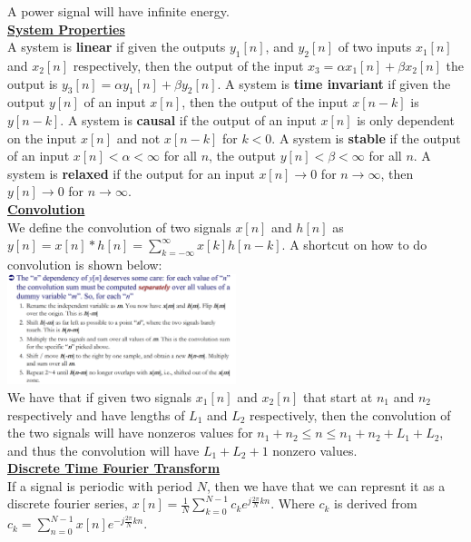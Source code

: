 \documentclass[10pt]{article}
\begin{document}
A power signal will have infinite energy.\\
\underline{\textbf{System Properties}}\\
A system is \textbf{linear} if given the outputs $y_1[n]$, and $y_2[n]$ of two inputs $x_1[n]$ and $x_2[n]$ respectively, 
then the output of the input $x_3=\alpha x_1[n]+\beta x_2[n]$ the output is $y_3[n]=\alpha y_1[n]+\beta y_2[n]$. 
A system is \textbf{time invariant} if given the output $y[n]$ of an input $x[n]$, then the output of the input $x[n-k]$ is $y[n-k]$. A system is \textbf{causal} if the output of an input $x[n]$ is only dependent on the input $x[n]$ and not $x[n-k]$ for $k<0$. 
A system is \textbf{stable} if the output of an input $x[n]<\alpha<\infty$ for all $n$, the output $y[n]<\beta<\infty$ for all $n$. A
system is \textbf{relaxed} if the output for an input $x[n]\to0$ for $n\to\infty$, then $y[n]\to0$ for $n\to\infty$.\\
\underline{\textbf{Convolution}}\\
We define the convolution of two signals $x[n]$ and $h[n]$ as $\boxed{y[n]=x[n]*h[n]=\sum_{k=-\infty}^{\infty}x[k]h[n-k]}$. A shortcut on how to do 
convolution is shown below:\\
\includegraphics[width=0.5\textwidth]{convolution.png}\\
We have that if given two signals $x_1[n]$ and $x_2[n]$ that start at $n_1$ and $n_2$ respectively and have lengths of 
$L_1$ and $L_2$ respectively, then the convolution of the two signals will have nonzeros values for $n_1+n_2\leq n\leq n_1+n_2+L_1+L_2$, and thus
the convolution will have $L_1+L_2+1$ nonzero values. \\
\underline{\textbf{Discrete Time Fourier Transform}}\\
If a signal is periodic with period $N$, then we have that we can represnt it as a discrete fourier series, $\boxed{x[n]=\frac{1}{N}\sum_{k=0}^{N-1}c_ke^{j\frac{2\pi}{N}kn}}$. Where
$c_k$ is derived from $\boxed{c_k=\sum_{n=0}^{N-1}x[n]e^{-j\frac{2\pi}{N}kn}}$.
\end{document}

